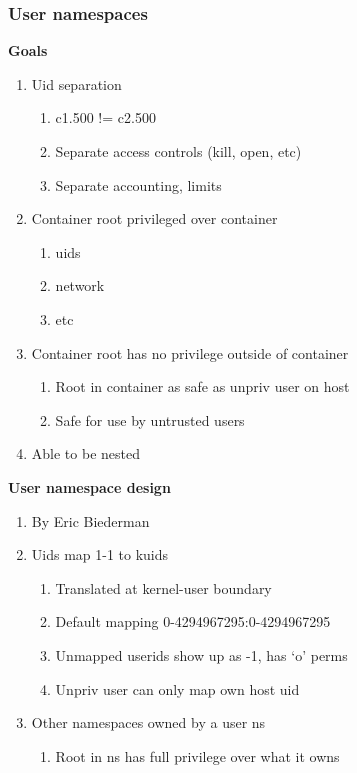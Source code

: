\documentclass{beamer}
\begin{document}
\begin{frame}[fragile]
\frametitle{User namespaces}
\textbf{Goals}
\begin{enumerate}
\item Uid separation
	\begin{enumerate}
	\item c1.500 != c2.500
	\item Separate access controls (kill, open, etc)
	\item Separate accounting, limits
	\end{enumerate}
\item Container root privileged over container
	\begin{enumerate}
	\item uids
	\item network
	\item etc
	\end{enumerate}
\item Container root has no privilege outside of container
	\begin{enumerate}
	\item Root in container as safe as unpriv user on host
	\item Safe for use by untrusted users
	\end{enumerate}
\item Able to be nested
\end{enumerate}
\end{frame}

\begin{frame}[fragile]
\textbf{User namespace design}
\begin{enumerate}
\item By Eric Biederman
\item Uids map 1-1 to kuids
	\begin{enumerate}
	\item Translated at kernel-user boundary
	\item Default mapping 0-4294967295:0-4294967295
	\item Unmapped userids show up as -1, has `o' perms
	\item Unpriv user can only map own host uid
	\end{enumerate}
\item Other namespaces owned by a user ns
	\begin{enumerate}
	\item Root in ns has full privilege over what it owns
	\end{enumerate}
\end{enumerate}
\end{frame}
\end{document}
